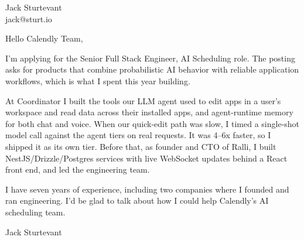 \documentclass[11pt]{article}
\begin{document}
\raggedright

{\namefont\fontsize{20pt}{24pt}\selectfont Jack Sturtevant}\\[-0.3em]
jack@sturt.io

\vspace{1.2em}

Hello Calendly Team,

I'm applying for the Senior Full Stack Engineer, AI Scheduling role. The posting asks for products that combine probabilistic AI behavior with reliable application workflows, which is what I spent this year building.

At Coordinator I built the tools our LLM agent used to edit apps in a user's workspace and read data across their installed apps, and agent-runtime memory for both chat and voice. When our quick-edit path was slow, I timed a single-shot model call against the agent tiers on real requests. It was 4--6x faster, so I shipped it as its own tier. Before that, as founder and CTO of Ralli, I built NestJS/Drizzle/Postgres services with live WebSocket updates behind a React front end, and led the engineering team.

I have seven years of experience, including two companies where I founded and ran engineering. I'd be glad to talk about how I could help Calendly's AI scheduling team.

\vspace{0.6em}
Jack Sturtevant
\end{document}
